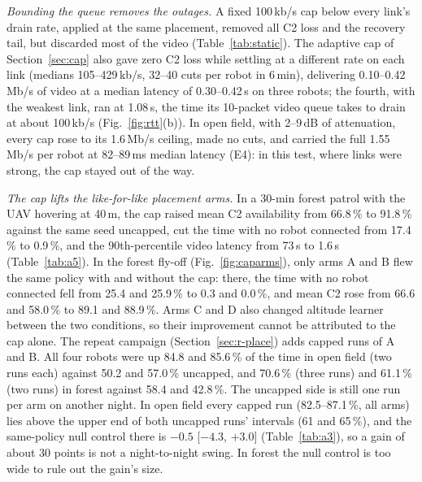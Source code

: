 \begin{table}[t]
\caption{Static Forest Load Test, Four Robots, 6\,min of Video}
\label{tab:static}
\centering
\footnotesize\setlength{\tabcolsep}{3pt}

\end{table}

\textit{Bounding the queue removes the outages.} A fixed 100\,kb/s cap below
every link's drain rate, applied at the same placement, removed all C2 loss and
the recovery tail, but discarded most of the video (Table~\ref{tab:static}).
The adaptive cap of Section~\ref{sec:cap} also gave zero C2 loss while settling
at a different rate on each link (medians 105--429\,kb/s, 32--40 cuts per robot
in 6\,min), delivering 0.10--0.42\,Mb/s of video at a median latency of
0.30--0.42\,s on three robots; the fourth, with the weakest link, ran at
1.08\,s, the time its 10-packet video queue takes to drain at about 100\,kb/s
(Fig.~\ref{fig:rtt}(b)). In open field, with 2--9\,dB of attenuation, every cap
rose to its 1.6\,Mb/s ceiling, made no cuts, and carried the full 1.55\,Mb/s
per robot at 82--89\,ms median latency (E4): in this test, where links were
strong, the cap stayed out of the way.

\textit{The cap lifts the like-for-like placement arms.} In a 30-min forest patrol with
the UAV hovering at 40\,m, the cap raised mean C2 availability from 66.8\,\% to
91.8\,\% against the same seed uncapped, cut the time with no robot connected
from 17.4\,\% to 0.9\,\%, and the 90th-percentile video latency from 73\,s to
1.6\,s (Table~\ref{tab:a5}). In the forest fly-off (Fig.~\ref{fig:caparms}), only arms A and B flew
the same policy with and without the cap: there, the time with no robot
connected fell from 25.4 and 25.9\,\% to 0.3 and 0.0\,\%, and mean C2 rose from
66.6 and 58.0\,\% to 89.1 and 88.9\,\%. Arms C and D also changed altitude
learner between the two conditions, so their improvement cannot be attributed
to the cap alone. The repeat campaign (Section~\ref{sec:r-place}) adds capped
runs of A and B. All four robots were up 84.8 and 85.6\,\% of the time in open
field (two runs each) against 50.2 and 57.0\,\% uncapped, and 70.6\,\% (three
runs) and 61.1\,\% (two runs) in forest against 58.4 and 42.8\,\%. The
uncapped side is still one run per arm on another night. In open field every
capped run (82.5--87.1\,\%, all arms) lies above the upper end of both
uncapped runs' intervals (61 and 65\,\%), and the same-policy null control
there is $-0.5$ [$-4.3$, $+3.0$] (Table~\ref{tab:a3}), so a gain of about 30
points is not a night-to-night swing. In forest the null control is too wide
to rule out the gain's size.

